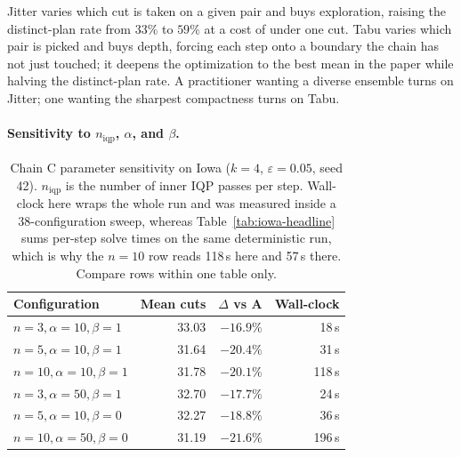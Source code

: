 \documentclass[11pt]{article}
\begin{document}
Jitter varies which cut is taken on a given pair and buys exploration,
raising the distinct-plan rate from $33\%$ to $59\%$ at a cost of
under one cut. Tabu varies which pair is picked and buys depth,
forcing each step onto a boundary the chain has not just touched; it
deepens the optimization to the best mean in the paper while halving
the distinct-plan rate. A practitioner wanting a diverse ensemble
turns on Jitter; one wanting the sharpest compactness turns on Tabu.

\paragraph{Sensitivity to $n_{\mathrm{iqp}}$, $\alpha$, and $\beta$.}\label{sec:exp-sensitivity}

\begin{table}[htbp]
\centering
\small
\begin{tabular}{lrrr}
\toprule
Configuration & Mean cuts & $\Delta$ vs A & Wall-clock \\
\midrule
$n = 3, \alpha = 10, \beta = 1$  & 33.03 & $-16.9\%$ & 18\,s \\
$n = 5, \alpha = 10, \beta = 1$  & 31.64 & $-20.4\%$ & 31\,s \\
$n = 10, \alpha = 10, \beta = 1$ & 31.78 & $-20.1\%$ & 118\,s \\
$n = 3, \alpha = 50, \beta = 1$  & 32.70 & $-17.7\%$ & 24\,s \\
$n = 5, \alpha = 10, \beta = 0$  & 32.27 & $-18.8\%$ & 36\,s \\
$n = 10, \alpha = 50, \beta = 0$ & 31.19 & $-21.6\%$ & 196\,s \\
\bottomrule
\end{tabular}
\caption{Chain C parameter sensitivity on Iowa ($k = 4$,
  $\varepsilon = 0.05$, seed 42). $n_{\mathrm{iqp}}$ is the number of
  inner IQP passes per step. Wall-clock here wraps the whole run and
  was measured inside a 38-configuration sweep, whereas
  Table~\ref{tab:iowa-headline} sums per-step solve times on the same
  deterministic run, which is why the $n = 10$ row reads 118\,s here
  and 57\,s there. Compare rows within one table only.}\label{tab:sensitivity}
\end{table}
\end{document}
